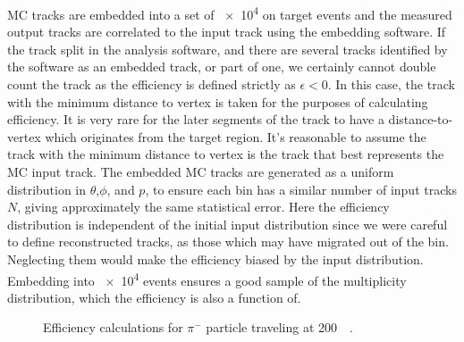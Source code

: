  MC tracks are embedded into a set of \num{e4} on target events and the measured output tracks are correlated to the input track using the embedding software. If the track split in the analysis software, and there are several tracks identified by the software as an embedded track, or part of one, we certainly cannot double count the track as the efficiency is  defined strictly as $\epsilon < 0$. In this case, the track with the minimum distance to vertex is taken for the purposes of calculating efficiency. It is very rare for the later segments of the track to have a distance-to-vertex which originates from the target region. It's reasonable to assume the track with the minimum distance to vertex is the track that best represents the MC input track. The embedded MC tracks are generated as a uniform distribution in $\theta$,$\phi$, and $p$, to ensure each bin has a similar number of input tracks $N$, giving approximately the same statistical error. Here the efficiency distribution is independent of the initial input distribution since we were careful to define reconstructed tracks, as those which may have migrated out of the bin. Neglecting them would make the efficiency biased by the input distribution. Embedding into \num{e4}  events ensures a good sample of the multiplicity distribution, which the efficiency is also a function of. 
 
 \begin{figure}[!htb]%
    \centering
    \qquad
	\caption{Efficiency calculations for $\pi^-$ particle traveling at \SI{200}{\mega\eVperc}.}
	\label{fig:pim_eff_ex}
\end{figure}
 
